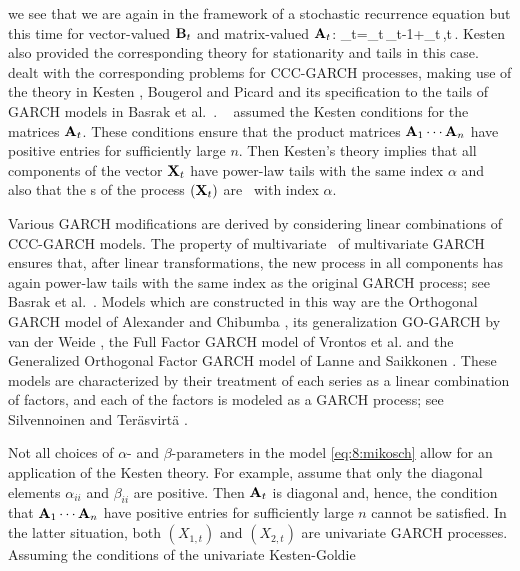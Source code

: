we see that we are again in the framework of a stochastic recurrence
equation but this time for vector-valued ${\mathbf B}_t$ and matrix-valued
${\mathbf A}_t$:
\beam\label{eq:jan6b:mikosch}
\bfY_t=\bfA_t\,\bfY_{t-1}+\bfB_t\,,\qquad t\in\bbz\,.
\eeam
Kesten \cite{kesten:1973} also provided the corresponding theory  
for stationarity and tails in this case. \sta\ \cite{starica:1999}
dealt with the corresponding problems for CCC-GARCH processes,
making use of the theory in Kesten \cite{kesten:1973},
Bougerol and Picard \cite{bougerol:picard:1992}
and its
specification to the tails of GARCH models 
in Basrak et al.~\cite{basrak:davis:mikosch:2002}. \sta\ \cite{starica:1999} assumed the 
Kesten conditions for the matrices ${\mathbf A}_t$. These conditions ensure
that the product matrices ${\mathbf A}_1\cdots{\mathbf A}_n$ have positive entries
for sufficiently large $n$. Then Kesten's theory implies that all
components of the vector ${\mathbf X}_t$ have power-law tails with the same
index $\alpha$ and also that the \fidi s of the process $({\mathbf X}_t)$ are
\regvary\ with index $\alpha$.
\par
Various GARCH modifications are derived by considering linear
combinations of CCC-GARCH models. The property of multivariate
\regvar\ of multivariate GARCH ensures that, after linear
transformations,  the new process in all components has again
power-law tails with the same index as the original GARCH process; see
Basrak et al.~\cite{basrak:davis:mikosch:2002}.
Models which are constructed in this way are
the Orthogonal GARCH model of
Alexander and Chibumba \cite{alexander:chibumba:1996}, its
generalization GO-GARCH by van der Weide \cite{Weide2002},  the Full
Factor GARCH model of Vrontos et al. \cite{vrontos2003full} and the
Generalized Orthogonal Factor GARCH model of Lanne and Saikkonen
\cite{lanne2007modelling}. These models are characterized by their
treatment of each series as a linear combination of factors, and each
of the factors is modeled as a GARCH process; see Silvennoinen and
Ter\"asvirt\"a \cite{silventeras:2009}.
\par
Not all choices of $\alpha$- and $\beta$-parameters in the model
\eqref{eq:8:mikosch} allow for an application of the Kesten theory. For
example, assume that only the diagonal elements $\alpha_{ii}$ and
$\beta_{ii}$ are positive. Then ${\mathbf A}_t$ is diagonal and, hence, the
condition that ${\mathbf A}_1\cdots{\mathbf A}_n$ have positive entries for
sufficiently large $n$  cannot be satisfied. In the latter situation,
both $(X_{1,t})$ and $(X_{2,t})$ are univariate GARCH
processes. Assuming the  conditions of the univariate Kesten-Goldie

